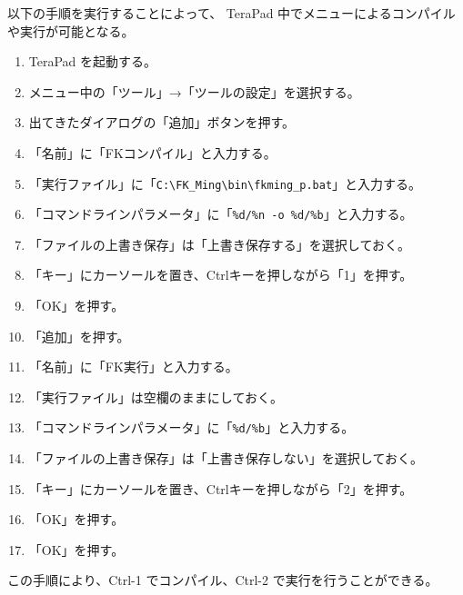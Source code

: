 \documentclass[a4j]{jarticle}
\begin{document}
以下の手順を実行することによって、
TeraPad 中でメニューによるコンパイルや実行が可能となる。

\begin{enumerate}

\item TeraPad を起動する。

\item メニュー中の「ツール」→「ツールの設定」を選択する。

\item 出てきたダイアログの「追加」ボタンを押す。

\item 「名前」に「FKコンパイル」と入力する。

\item 「実行ファイル」に「\verb+C:\FK_Ming\bin\fkming_p.bat+」と入力する。

\item 「コマンドラインパラメータ」に「\verb+%d/%n -o %d/%b+」と入力する。

\item 「ファイルの上書き保存」は「上書き保存する」を選択しておく。

\item 「キー」にカーソールを置き、Ctrlキーを押しながら「1」を押す。

\item 「OK」を押す。

\item 「追加」を押す。

\item 「名前」に「FK実行」と入力する。

\item 「実行ファイル」は空欄のままにしておく。

\item 「コマンドラインパラメータ」に「\verb+%d/%b+」と入力する。

\item 「ファイルの上書き保存」は「上書き保存しない」を選択しておく。

\item 「キー」にカーソールを置き、Ctrlキーを押しながら「2」を押す。

\item 「OK」を押す。

\item 「OK」を押す。
\end{enumerate}
この手順により、Ctrl-1 でコンパイル、Ctrl-2 で実行を行うことができる。
\end{document}
